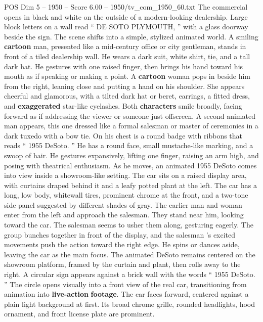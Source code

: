 \begin{textsample}{POS Dim 5 – 1950 – Score 6.00 – 1950/tv\_com\_1950\_60.txt}  \label{ex:f5_pos_077}
The commercial opens in black and white on the outside of a modern-looking dealership.
Large block letters on a wall read “ DE SOTO PLYMOUTH, ” with a glass doorway beside the sign.
The scene shifts into a simple, stylized animated world.
A smiling \textbf{cartoon} man, presented like a mid-century office or city gentleman, stands in front of a tiled dealership wall.
He wears a dark suit, white shirt, tie, and a tall dark hat.
He gestures with one raised finger, then brings his hand toward his mouth as if speaking or making a point.
A \textbf{cartoon} woman pops in beside him from the right, leaning close and putting a hand on his shoulder.
She appears cheerful and glamorous, with a tilted dark hat or beret, earrings, a fitted dress, and \textbf{exaggerated} star-like eyelashes.
Both \textbf{characters} smile broadly, facing forward as if addressing the viewer or someone just offscreen.
A second animated man appears, this one dressed like a formal salesman or master of ceremonies in a dark tuxedo with a bow tie.
On his chest is a round badge with ribbons that reads “ 1955 DeSoto. ” He has a round face, small mustache-like marking, and a swoop of hair.
He gestures expansively, lifting one finger, raising an arm high, and posing with theatrical enthusiasm.
As he moves, an animated 1955 DeSoto comes into view inside a showroom-like setting.
The car sits on a raised display area, with curtains draped behind it and a leafy potted plant at the left.
The car has a long, low body, whitewall tires, prominent chrome at the front, and a two-tone side panel suggested by different shades of gray.
The earlier man and woman enter from the left and approach the salesman.
They stand near him, looking toward the car.
The salesman seems to usher them along, gesturing eagerly.
The group bunches together in front of the display, and the salesman ’s excited movements push the action toward the right edge.
He spins or dances aside, leaving the car as the main focus.
The animated DeSoto remains centered on the showroom platform, framed by the curtain and plant, then rolls away to the right.
A circular sign appears against a brick wall with the words “ 1955 DeSoto. ” The circle opens visually into a front view of the real car, transitioning from animation into \textbf{live-action} \textbf{footage}.
The car faces forward, centered against a plain light background at first.
Its broad chrome grille, rounded headlights, hood ornament, and front license plate are prominent.

\end{textsample}
